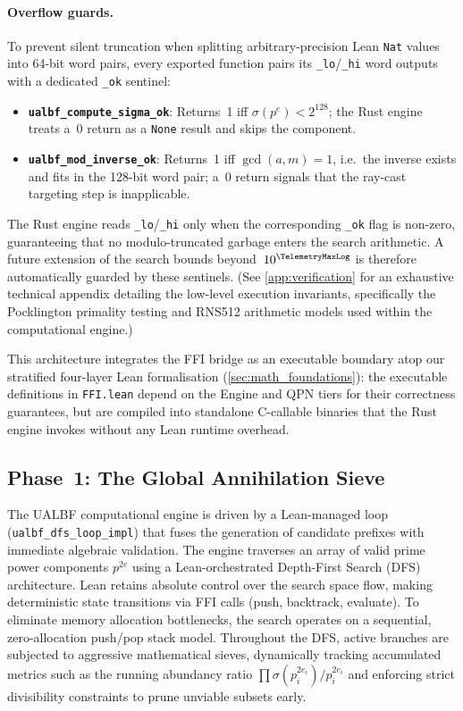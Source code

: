 \paragraph{Overflow guards.}
To prevent silent truncation when splitting arbitrary-precision Lean
\texttt{Nat} values into 64-bit word pairs, every exported function
pairs its \texttt{\_lo}/\texttt{\_hi} word outputs with a dedicated
\texttt{\_ok} sentinel:
\begin{itemize}
  \item \textbf{\texttt{ualbf\_compute\_sigma\_ok}}: Returns~1 iff
    $\sigma(p^e) < 2^{128}$; the Rust engine treats a~0 return as a
    \texttt{None} result and skips the component.
  \item \textbf{\texttt{ualbf\_mod\_inverse\_ok}}: Returns~1 iff
    $\gcd(a, m) = 1$, i.e.\ the inverse exists and fits in the
    128-bit word pair; a~0 return signals that the ray-cast targeting
    step is inapplicable.
\end{itemize}
The Rust engine reads \texttt{\_lo}/\texttt{\_hi} only when the
corresponding \texttt{\_ok} flag is non-zero, guaranteeing that
no modulo-truncated garbage enters the search arithmetic.  A future
extension of the search bounds beyond~$10^{\TelemetryMaxLog}$ is therefore
automatically guarded by these sentinels. (See \cref{app:verification} for an exhaustive technical appendix detailing the low-level execution invariants, specifically the Pocklington primality testing and RNS512 arithmetic models used within the computational engine.)

This architecture integrates the FFI bridge as an executable boundary atop our
stratified four-layer Lean formalisation (\cref{sec:math_foundations}): the executable
definitions in \texttt{FFI.lean} depend on the Engine and QPN tiers for their
correctness guarantees, but are compiled into standalone C-callable
binaries that the Rust engine invokes without any Lean runtime overhead.


\subsection{Phase~1: The Global Annihilation Sieve}
\label{subsec:global_sieve}

The UALBF computational engine is driven by a Lean-managed loop
(\texttt{ualbf\_\allowbreak{}dfs\_\allowbreak{}loop\_\allowbreak{}impl}) that fuses the generation of candidate prefixes with
immediate algebraic validation.  The engine traverses an array of valid
prime power components $p^{2e}$ using a Lean-orchestrated Depth-First Search (DFS)
architecture. Lean retains absolute control over the search space flow, making deterministic
state transitions via FFI calls (push, backtrack, evaluate). To eliminate memory allocation bottlenecks,
the search operates on a sequential, zero-allocation push/pop stack model.
Throughout the DFS, active branches are subjected to
aggressive mathematical sieves, dynamically tracking accumulated metrics
such as the running abundancy ratio
$\prod \sigma(p_i^{2e_i})/p_i^{2e_i}$ and enforcing strict divisibility
constraints to prune unviable subsets early.

